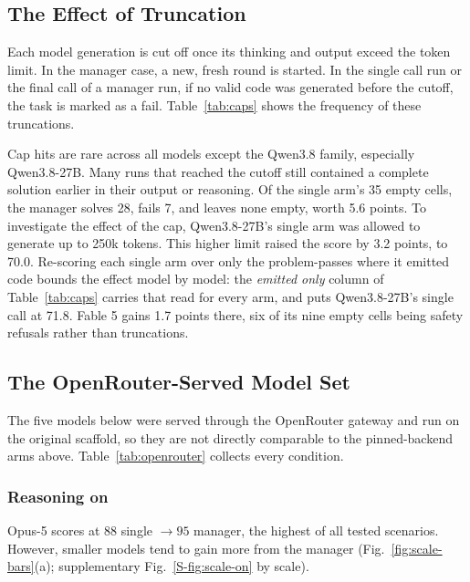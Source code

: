 \documentclass[journal]{IEEEtran}
\begin{document}
\subsection{The Effect of Truncation}
\label{sec:truncation}

Each model generation is cut off once its thinking and output exceed the token limit. In the manager case, a new, fresh round is started. In the single call run or the final call of a manager run, if no valid code was generated before the cutoff, the task is marked as a fail. Table~\ref{tab:caps} shows the frequency of these truncations.




Cap hits are rare across all models except the Qwen3.8 family, especially Qwen3.8-27B. Many runs that reached the cutoff still contained a complete solution earlier in their output or reasoning.
Of the single arm's 35 empty cells, the manager
solves 28, fails 7, and leaves none empty, worth 5.6 points. To investigate the effect of the cap, Qwen3.8-27B's
single arm was allowed to generate up to 250k tokens. This higher limit raised the score by 3.2
points, to 70.0. Re-scoring each single arm over only the problem-passes
where it emitted code bounds the effect model by model: the \emph{emitted only} column of
Table~\ref{tab:caps} carries that read for every arm, and puts Qwen3.8-27B's single call at 71.8.
Fable 5
gains 1.7 points there, six of its nine empty cells being safety refusals rather than
truncations.

\subsection{The OpenRouter-Served Model Set}
\label{sec:openrouter}







The five models below were served through the OpenRouter gateway and run on the original
scaffold, so they are not directly comparable to the pinned-backend arms above.
Table~\ref{tab:openrouter} collects every condition.

\subsubsection{Reasoning on} Opus-5 scores at $88$ single $\to 95$ manager, the highest of all tested scenarios. However, smaller models tend to gain more from the manager (Fig.~\ref{fig:scale-bars}(a); supplementary Fig.~\ref{S-fig:scale-on} by scale).
\end{document}
